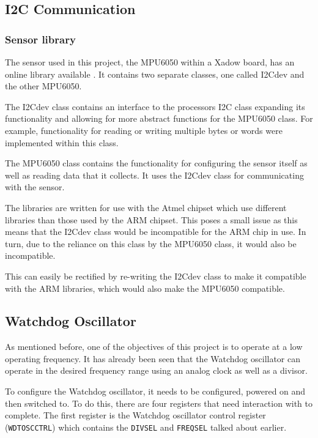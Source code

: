 
\subsection{I2C Communication}

\subsubsection{Sensor library}

The  sensor used in this project, the MPU6050 within a Xadow board, has an online library available \cite{sensory_library}. It contains two separate classes, one called I2Cdev and the other MPU6050. 

The I2Cdev class contains an interface to the processors I2C class expanding its functionality and allowing for more abstract functions for the MPU6050 class. For example, functionality for reading or writing multiple bytes or words were implemented within this class.

The MPU6050 class contains the functionality for configuring the sensor itself as well as reading data that it collects. It uses the I2Cdev class for communicating with the sensor.

The libraries are written for use with the Atmel chipset which use different libraries than those used by the ARM chipset. This poses a small issue as this means that the I2Cdev class would be incompatible for the ARM chip in use. In turn, due to the reliance on this class by the MPU6050 class, it would also be incompatible. 

This can easily be rectified by re-writing the I2Cdev class to make it compatible with the ARM libraries, which would also make the MPU6050 compatible.

\subsection{Watchdog Oscillator}

As mentioned before, one of the objectives of this project is to operate at a low operating frequency. It has already been seen that the Watchdog oscillator can operate in the desired frequency range using an analog clock as well as a divisor. 

To configure the Watchdog oscillator, it needs to be configured, powered on and then switched to. To do this, there are four registers that need interaction with to complete. The first register is the Watchdog oscillator control register (\verb|WDTOSCCTRL|) which contains the \verb|DIVSEL| and \verb|FREQSEL| talked about earlier. 

